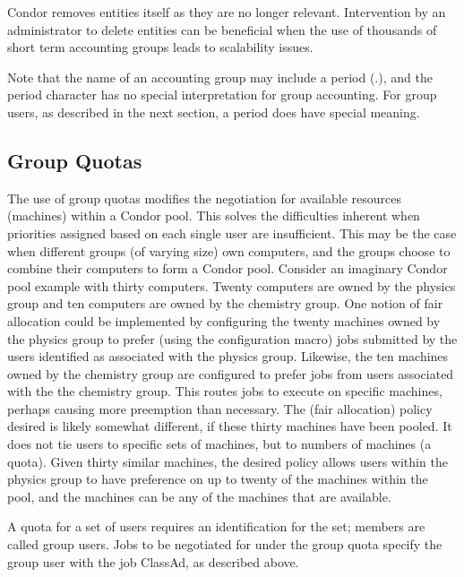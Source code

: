 Condor removes entities itself as they are no longer
relevant.
Intervention by an administrator to delete entities can
be beneficial when the use of thousands
of short term accounting groups leads to scalability
issues.

Note that the name of an accounting group may include a period (.),
and the period character has
no special interpretation for group accounting.
For group users, 
as described in the next section,
a period does have special meaning.

\subsection{\label{sec:group-quotas}Group Quotas}

The use of group quotas modifies the negotiation for 
available resources (machines) within a Condor pool.
This solves the difficulties inherent when
priorities assigned based on each single user are insufficient.
This may be the case when
different groups (of varying size) own computers,
and the groups choose to combine their computers to
form a Condor pool.
Consider an imaginary Condor pool example with thirty computers.
Twenty computers are owned by the physics group and ten
computers are owned by the chemistry group.
One notion of fair allocation could be implemented 
by configuring the twenty machines owned by the physics group
to prefer (using the  configuration macro)
jobs submitted by the users identified as associated
with the physics group.
Likewise, the ten machines owned by the chemistry group are
configured to prefer jobs from users associated with the
the chemistry group.
This routes jobs to execute on specific machines,
perhaps causing more preemption than necessary.
The (fair allocation) policy desired is likely somewhat different,
if these thirty machines have been pooled.
It does not tie users to specific sets of machines,
but to numbers of machines (a quota).
Given thirty similar machines,
the desired policy allows users within the physics group to have
preference on up to twenty of the machines within the pool,
and the machines can be any of the machines that are available.

A quota for a set of users requires an identification for
the set; members are called group users.
Jobs to be negotiated for under the group quota
specify the group user with the 
 job ClassAd, as described above.

